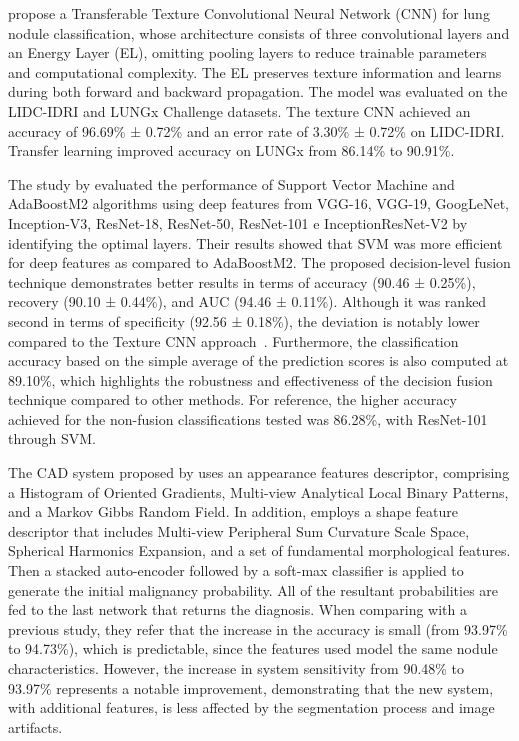 \citet{ali_efficient_2020} propose a Transferable Texture Convolutional Neural Network (CNN) for lung nodule classification, whose architecture consists of three convolutional layers and an Energy Layer (EL), omitting pooling layers to reduce trainable parameters and computational complexity. The EL preserves texture information and learns during both forward and backward propagation. The model was evaluated on the LIDC-IDRI and LUNGx Challenge datasets. The texture CNN achieved an accuracy of 96.69\% ± 0.72\% and an error rate of 3.30\% ± 0.72\% on LIDC-IDRI. Transfer learning improved accuracy on LUNGx from 86.14\% to 90.91\%.  

The study by \citet{ali_deep_2021} evaluated the performance of Support Vector Machine and AdaBoostM2 algorithms using deep features from VGG-16, VGG-19, GoogLeNet, Inception-V3, ResNet-18, ResNet-50, ResNet-101 e InceptionResNet-V2 by identifying the optimal layers. Their results showed that SVM was more efficient for deep features as compared to AdaBoostM2. The proposed decision-level fusion technique demonstrates better results in terms of accuracy (90.46 ± 0.25\%), recovery (90.10 ± 0.44\%), and AUC (94.46 ± 0.11\%). Although it was ranked second in terms of specificity (92.56 ± 0.18\%), the deviation is notably lower compared to the Texture CNN approach~\cite{ali_efficient_2020}. Furthermore, the classification accuracy based on the simple average of the prediction scores is also computed at 89.10\%, which highlights the robustness and effectiveness of the decision fusion technique compared to other methods. For reference, the  higher accuracy achieved for the non-fusion classifications tested was 86.28\%, with ResNet-101 through SVM.

The CAD system proposed by \citet{shaffie_computer-assisted_2022} uses an appearance features descriptor, comprising a Histogram of Oriented Gradients, Multi-view Analytical Local Binary Patterns, and a Markov Gibbs Random Field. In addition, employs a shape feature descriptor that includes Multi-view Peripheral Sum Curvature Scale Space, Spherical Harmonics Expansion, and a set of fundamental morphological features. Then a stacked auto-encoder followed by a soft-max classifier is applied to generate the initial malignancy probability. All of the resultant probabilities are fed to the last network that returns the diagnosis. When comparing with a previous study, they refer that the increase in the accuracy is small (from 93.97\% to 94.73\%), which is predictable, since the features used model the same nodule characteristics. However, the increase in system sensitivity from 90.48\% to 93.97\% represents a notable improvement, demonstrating that the new system, with additional features, is less affected by the segmentation process and image artifacts.

